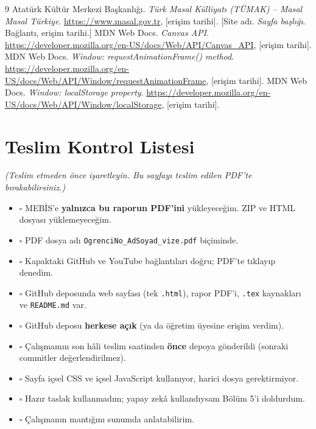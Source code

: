 \documentclass[12pt,a4paper]{article}
\newcommand{\aciklama}[1]{{\color{gray}\itshape (#1)}}
\begin{document}
\begin{thebibliography}{9}
 Atatürk Kültür Merkezi Başkanlığı. \emph{Türk Masal Külliyatı (TÜMAK) -- Masal Masal Türkiye}. \url{https://www.masal.gov.tr}, [erişim tarihi].
 [Site adı. \emph{Sayfa başlığı}. Bağlantı, erişim tarihi.]
 MDN Web Docs. \emph{Canvas API}. \url{https://developer.mozilla.org/en-US/docs/Web/API/Canvas_API}, [erişim tarihi].
 MDN Web Docs. \emph{Window: requestAnimationFrame() method}. \url{https://developer.mozilla.org/en-US/docs/Web/API/Window/requestAnimationFrame}, [erişim tarihi].
 MDN Web Docs. \emph{Window: localStorage property}. \url{https://developer.mozilla.org/en-US/docs/Web/API/Window/localStorage}, [erişim tarihi].
\end{thebibliography}

\appendix
\section{Teslim Kontrol Listesi}
\aciklama{Teslim etmeden önce işaretleyin. Bu sayfayı teslim edilen PDF'te bırakabilirsiniz.}
\begin{itemize}[label={}]
  \item $\square$ MEBİS'e \textbf{yalnızca bu raporun PDF'ini} yükleyeceğim. ZIP ve HTML dosyası yüklemeyeceğim.
  \item $\square$ PDF dosya adı \texttt{OgrenciNo\_AdSoyad\_vize.pdf} biçiminde.
  \item $\square$ Kapaktaki GitHub ve YouTube bağlantıları doğru; PDF'te tıklayıp denedim.
  \item $\square$ GitHub deposunda web sayfası (tek \texttt{.html}), rapor PDF'i, \texttt{.tex} kaynakları ve \texttt{README.md} var.
  \item $\square$ GitHub deposu \textbf{herkese açık} (ya da öğretim üyesine erişim verdim).
  \item $\square$ Çalışmamın son hâli teslim saatinden \textbf{önce} depoya gönderildi (sonraki commitler değerlendirilmez).
  \item $\square$ Sayfa içsel CSS ve içsel JavaScript kullanıyor, harici dosya gerektirmiyor.
  \item $\square$ Hazır taslak kullanmadım; yapay zekâ kullandıysam Bölüm 5'i doldurdum.
  \item $\square$ Çalışmanın mantığını sunumda anlatabilirim.
\end{itemize}
\end{document}
